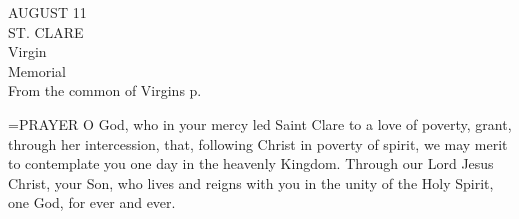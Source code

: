 \begin{center}\normalsize AUGUST 11\\
\footnotesize ST. CLARE\\
\footnotesize Virgin\\
\footnotesize Memorial\\
\footnotesize From the common of Virgins p. \\
\end{center}

\hangindent=\parindent \small{PRAYER 
O God, who in your mercy led Saint Clare to a love of poverty,
grant, through her intercession,
that, following Christ in poverty of spirit,
we may merit to contemplate you
one day in the heavenly Kingdom.
Through our Lord Jesus Christ, your Son,
who lives and reigns with you in the unity of the Holy Spirit,
one God, for ever and ever.\\}
 
